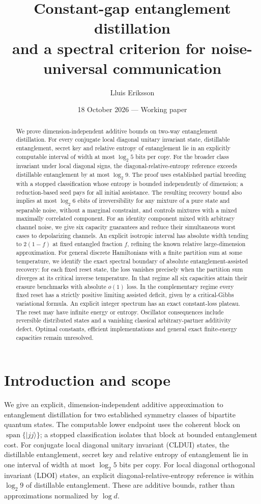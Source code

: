 \documentclass[11pt]{article}
\title{Constant-gap entanglement distillation\\and a spectral criterion for noise-universal communication}
\author{Lluis Eriksson}
\date{18 October 2026 --- Working paper}
\begin{document}
\maketitle
\begin{abstract}
We prove dimension-independent additive bounds on two-way entanglement
distillation. For every conjugate local diagonal unitary invariant
state, distillable entanglement, secret key and relative entropy of
entanglement lie in an explicitly computable interval of width at most
$\log_2 5$ bits per copy. For the broader class invariant under local
diagonal signs, the diagonal-relative-entropy reference exceeds
distillable entanglement by at most $\log_2 9$.
The proof uses established partial breeding with a stopped classification
whose entropy is bounded independently of dimension; a reduction-based
seed pays for all initial assistance. The resulting recovery bound
also implies at most $\log_2 6$ ebits of irreversibility for any mixture
of a pure state and separable noise, without a marginal constraint,
and controls mixtures with a mixed maximally correlated component.
For an identity component mixed with arbitrary channel noise, we give
six capacity guarantees and reduce their simultaneous worst cases to
depolarizing channels. An explicit isotropic interval has absolute width
tending to $2(1-f)$ at fixed entangled fraction $f$, refining the known
relative large-dimension approximation. For general discrete Hamiltonians with a finite partition sum at some
temperature, we identify the exact spectral boundary of absolute
entanglement-assisted recovery: for each fixed reset state, the loss
vanishes precisely when the partition sum diverges at its critical
inverse temperature. In that regime all six capacities attain their
erasure benchmarks with absolute $o(1)$ loss. In the complementary
regime every fixed reset has a strictly positive limiting assisted
deficit, given by a critical-Gibbs variational formula. An explicit
integer spectrum has an exact constant-loss plateau. The reset may
have infinite energy or entropy. Oscillator consequences include
reversible distributed states and a vanishing classical arbitrary-partner
additivity defect. Optimal constants, efficient implementations and
general exact finite-energy capacities remain unresolved.
\end{abstract}

\section{Introduction and scope}
We give an explicit, dimension-independent additive approximation to
entanglement distillation for two established symmetry classes of
bipartite quantum states. The computable lower endpoint uses the
coherent block on $\operatorname{span}\{|jj\rangle\}$; a stopped
classification isolates that block at bounded entanglement cost.
For conjugate local diagonal unitary invariant (CLDUI) states, the
distillable entanglement, secret key and relative entropy of entanglement
lie in one interval of width at most $\log_2 5$ bits per copy.
For local diagonal orthogonal invariant (LDOI) states, an explicit
diagonal-relative-entropy reference is within $\log_2 9$ of
distillable entanglement. These are additive bounds, rather than
approximations normalized by $\log d$.
\end{document}
